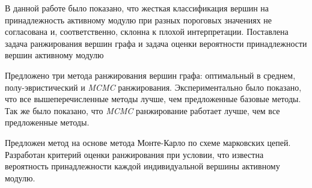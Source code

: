 \startconclusionpage

В данной работе было показано, что жесткая классификация вершин на
принадлежность активному модулю при разных пороговых значениях не согласована
и, соответственно, склонна к плохой интерпретации.  Поставлена задача
ранжирования вершин графа и задача оценки вероятности принадлежности вершин
активному модулю

Предложено три метода ранжирования вершин графа: оптимальный в среднем,
полу-эвристический и \emph{MCMC} ранжирования. Экспериментально было показано,
что все вышеперечисленные методы лучше, чем предложенные базовые методы. Так же
было показано, что \emph{MCMC} ранжирование работает лучше, чем все предложенные
методы.

Предложен метод на основе метода Монте-Карло по схеме марковских цепей.
Разработан критерий оценки ранжирования при условии, что известна вероятность
принадлежности каждой индивидуальной вершины активному модулю.


